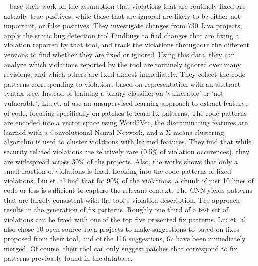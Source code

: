 \documentclass[
	a4paper,
	pagesize,
	pdftex,
	12pt,
	twoside, %
	BCOR=5mm, %
	ngerman,
	fleqn,
	final,
	]{scrartcl}
\begin{document}
~\cite{Liu.2018} base their work on the assumption that violations that are routinely fixed are actually true positives, while those that are ignored are likely to be either not important, or false positives. They investigate changes from 730 Java projects, apply the static bug detection tool Findbugs to find changes that are fixing a violation reported by that tool, and track the violations throughout the different versions to find whether they are fixed or ignored. Using this data, they can analyze which violations reported by the tool are routinely ignored over many revisions, and which others are fixed almost immediately. They collect the code patterns corresponding to violations based on representation with an abstract syntax tree. Instead of training a binary classifier on 'vulnerable' or 'not vulnerable', Liu et. al use an unsupervised learning approach to extract features of code, focusing specifically on patches to learn fix patterns. The code patterns are encoded into a vector space using Word2Vec, the discriminating features are learned with a Convolutional Neural Network, and a X-means clustering algorithm is used to cluster violations with learned features. They find that while security related violations are relatively rare (0.5\% of violation occurences), they are widespread across 30\% of the projects. Also, the works shows that only a small fraction of violations is fixed. Looking into the code patterns of fixed violations, Liu et. al find that for 90\% of the violations, a chunk of just 10 lines of code or less is sufficient to capture the relevant context. The CNN yields patterns that are largely consistent with the tool's violation description. The approach results in the generation of fix patterns. Roughly one third of a test set of violations can be fixed with one of the top five presented fix patterns. Liu et. al also chose 10 open source Java projects to make suggestions to based on fixes proposed from their tool, and of the 116 suggestions, 67 have been immediately merged. Of course, their tool can only suggest patches that correspond to fix patterns previously found in the database. \\
\end{document}
